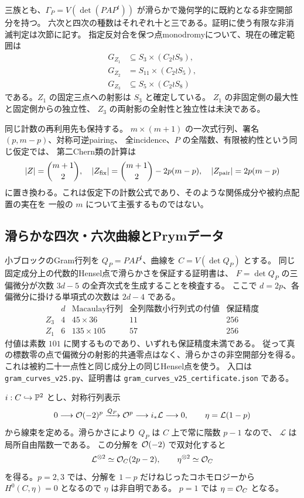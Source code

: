 三族とも、$\Gamma_P=V(\det(PAP^t))$ が滑らかで幾何学的に既約となる非空開部分を持つ。
六次と四次の種数はそれぞれ十と三である。証明に使う有限な非消滅判定は次節に記す。
指定反対合を保つ点monodromyについて、現在の確定範囲は
\[
 \begin{aligned}
 G_{Z_1}&\subseteq S_3\times(C_2\wr S_9),\\
 G_{Z_2}&=S_{11}\times(C_2\wr S_5),\\
 G_{Z_3}&\subseteq S_5\times(C_2\wr S_8)
 \end{aligned}
\]
である。$Z_1$ の固定三点への射影は $S_3$ と確定している。
$Z_1$ の非固定側の最大性と固定側からの独立性、
$Z_3$ の両射影の全射性と独立性は未決である。

同じ計数の再利用先も保持する。
$m\times(m+1)$ の一次式行列、署名 $(p,m-p)$、対称可逆pairing、
全incidence、$P$ の全階数、有限被約性という同じ仮定では、
第二Chern類の計算は
\[
 |Z|=\binom{m+1}{2},\quad
 |Z_{\rm fix}|=\binom{m+1}{2}-2p(m-p),\quad
 |Z_{\rm pair}|=2p(m-p)
\]
に置き換わる。これは仮定下の計数公式であり、そのような関係成分や被約点配置の実在を
一般の $m$ について主張するものではない。

\subsection{滑らかな四次・六次曲線とPrymデータ}
小ブロックのGram行列を $Q_P=PAP^t$、曲線を $C=V(\det Q_P)$ とする。
同じ固定成分上の代数的Hensel点で滑らかさを保証する証明書は、
$F=\det Q_P$ の三偏微分が次数 $3d-5$ の全斉次式を生成することを検査する。
ここで $d=2p$、各偏微分に掛ける単項式の次数は $2d-4$ である。
\[
 \begin{array}{c|c|c|c|c}
  &d&\text{Macaulay行列}&\text{全列階数小行列式の付値}&\text{保証精度}\\\hline
 Z_3&4&45\times36&11&256\\
 Z_1&6&135\times105&57&256
 \end{array}
\]
付値は素数 $101$ に関するものであり、いずれも保証精度未満である。
従って真の標数零の点で偏微分の射影的共通零点はなく、滑らかさの非空開部分を得る。
これは被約二十一点性と同じ成分上の同じHensel点を使う。
入口は \nolinkurl{gram_curves_v25.py}、証明書は
\nolinkurl{gram_curves_v25_certificate.json} である。

$i:C\hookrightarrow\mathbb P^2$ とし、対称行列表示
\[
 0\longrightarrow\mathcal O(-2)^p\xrightarrow{Q_P}\mathcal O^p
 \longrightarrow i_*\mathcal L\longrightarrow0,
 \qquad \eta=\mathcal L(1-p)
\]
から線束を定める。滑らかさにより $Q_P$ は $C$ 上で常に階数 $p-1$ なので、
$\mathcal L$ は局所自由階数一である。
この分解を $\mathcal O(-2)$ で双対化すると
\[
 \mathcal L^{\otimes2}\simeq\mathcal O_C(2p-2),\qquad
 \eta^{\otimes2}\simeq\mathcal O_C
\]
を得る。$p=2,3$ では、分解を $1-p$ だけねじったコホモロジーから
$H^0(C,\eta)=0$ となるので $\eta$ は非自明である。
$p=1$ では $\eta=\mathcal O_C$ となる。

